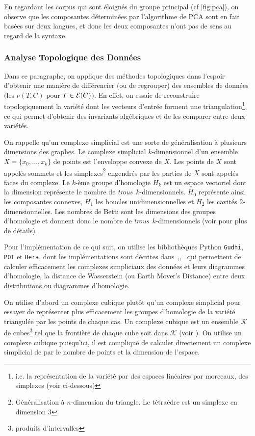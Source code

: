 \documentclass{cours}
\begin{document}
En regardant les corpus qui sont éloignés du groupe principal (cf \ref{fig:pca}), on observe que les composantes déterminées par l'algorithme de PCA sont en fait basées sur deux langues, et donc les deux composantes n'ont pas de sens au regard de la syntaxe.

\subsubsection{Analyse Topologique des Données}\label{subsub:tda}
Dans ce paragraphe, on applique des méthodes topologiques dans l'espoir d'obtenir une manière de différencier (ou de regrouper) des ensembles de données (les $\nu(T, C)$ pour $T\in \mathcal{E}(C)$).
En effet, on essaie de reconstruire topologiquement la variété dont les vecteurs d'entrée forment une triangulation\footnote{i.e. la représentation de la variété par des espaces linéaires par morceaux, des simplexes (voir ci-dessous)}, ce qui permet d'obtenir des invariants algébriques et de les comparer entre deux variétés.

On rappelle qu'un complexe simplicial est une sorte de généralisation à plusieurs dimensions des graphes. Le complexe simplicial $k$-dimensionnel d'un ensemble $X = \{x_{0}, \ldots, x_{k}\}$ de points est l'enveloppe convexe de $X$.
Les points de $X$ sont appelés sommets et les simplexes\footnote{Généralisation à $n$-dimension du triangle. Le tétraèdre est un simplexe en dimension $3$} engendrés par les parties de $X$ sont appelés faces du complexe.
Le $k$-ème groupe d'homologie $H_{k}$ est un espace vectoriel dont la dimension représente le nombre de \og\emph{trous}\fg\ $k$-dimensionnels.
$H_{0}$ représente ainsi les composantes connexes, $H_{1}$ les boucles unidimensionnelles et $H_{2}$ les cavités $2$-dimensionnelles.
Les nombres de Betti sont les dimensions des groupes d'homologie et donnent donc le nombre de \og\emph{trous}\fg\ $k$-dimensionnels (voir \cite{tldrtda} pour plus de détails).

Pour l'implémentation de ce qui suit, on utilise les bibliothèques Python \texttt{Gudhi}, \texttt{POT} et \texttt{Hera}, dont les implémentations sont décrites dans~\cite{Gudhi},\cite{PythonPOT},~\cite{Hera} qui permettent de calculer efficacement les complexes simpliciaux des données et leurs diagrammes d'homologie, la distance de Wasserstein (ou Earth Mover's Distance) entre deux distributions ou diagrammes d'homologie.

On utilise d'abord un complexe cubique plutôt qu'un complexe simplicial pour essayer de représenter plus efficacement les groupes d'homologie de la variété triangulée par les points de chaque cas.
Un complexe cubique est un ensemble $\mathcal{K}$ de cubes\footnote{produits d'intervalles} tel que la frontière de chaque cube soit dans $\mathcal{K}$ (voir \cite{cubicalhomology}).
On utilise un complexe cubique puisqu'ici, il est compliqué de calculer directement un complexe simplicial de par le nombre de points et la dimension de l'espace.
\end{document}
